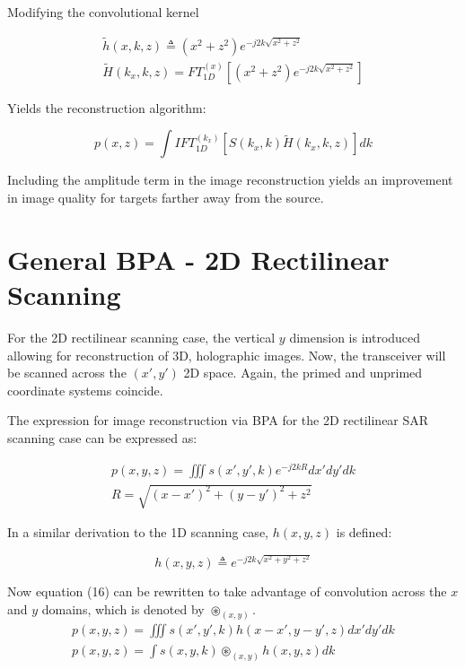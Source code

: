 \documentclass[conference]{IEEEtran}
\begin{document}
Modifying the convolutional kernel

\begin{gather}
	\tilde{h}(x,k,z) \triangleq (x^2+z^2)e^{-j2k\sqrt{ x^2 + z^2 }} \\
	\tilde{H}(k_x,k,z) = FT_{1D}^{(x)}\left[(x^2+z^2)e^{-j2k\sqrt{ x^2 + z^2 }}\right]
\end{gather}

Yields the reconstruction algorithm:

\begin{equation}
p(x,z) = \int IFT_{1D}^{(k_x)}\left[S(k_x,k)\tilde{H}(k_x,k,z)\right]dk
\end{equation}

Including the amplitude term in the image reconstruction yields an improvement in image quality for targets farther away from the source.

\section{General BPA - 2D Rectilinear Scanning}

For the 2D rectilinear scanning case, the vertical $y$ dimension is introduced allowing for reconstruction of 3D, holographic images. Now, the transceiver will be scanned across the $(x',y')$ 2D space. Again, the primed and unprimed coordinate systems coincide.

The expression for image reconstruction via BPA for the 2D rectilinear SAR scanning case can be expressed as:

\begin{gather}
	p(x,y,z) = \iiint s(x',y',k) e^{-j2kR} dx' dy' dk \\
	R = \sqrt{(x-x')^2 + (y-y')^2 + z^2}
\end{gather}

In a similar derivation to the 1D scanning case, $h(x,y,z)$ is defined:

\begin{equation}
	h(x,y,z) \triangleq e^{-j2k\sqrt{x^2 + y^2 + z^2}}
\end{equation}

Now equation (16) can be rewritten to take advantage of convolution across the $x$ and $y$ domains, which is denoted by $\circledast_{(x,y)}$.
\begin{gather}
	p(x,y,z) = \iiint s(x',y',k) h(x-x',y-y',z) dx'dy'dk \\
	p(x,y,z) = \int s(x,y,k) \circledast_{(x,y)} h(x,y,z) dk
\end{gather}
\end{document}
